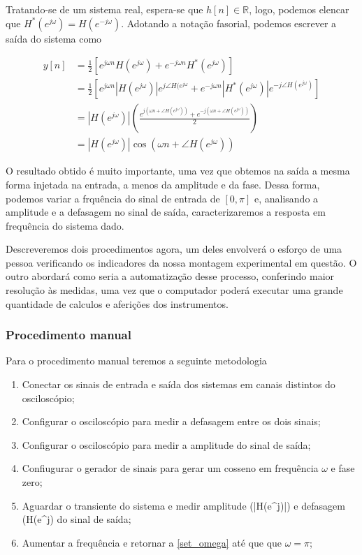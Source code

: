 \documentclass[x11names,a4paper,12pt]{article}
\begin{document}
Tratando-se de um sistema real, espera-se que $h[n] \in \mathbb{R}$, logo, podemos elencar que $H^{*}(e^{j\omega})=H(e^{-j\omega})$. Adotando a notação fasorial, podemos escrever a saída do sistema como

\begin{equation}
  \begin{aligned}
    y[n] & = \frac{1}{2} \left[ e^{j\omega n} H(e^{j\omega}) + e^{-j\omega n} H^*(e^{j\omega}) \right] \\
         & = \frac{1}{2} \left[ e^{j\omega n}|H(e^{j\omega})|e^{j\angle H(e^{j\omega}} + e^{-j\omega n} |H^*(e^{j\omega})|e^{-j\angle H(e^{j\omega})} \right] \\
         & = |H(e^{j\omega})| \left( \frac{e^{j(\omega n + \angle H(e^{j\omega}))} + e^{-j(\omega n + \angle H(e^{j\omega}))}}{2} \right) \\
         & = |H(e^{j\omega})| \cos{(\omega n + \angle H(e^{j\omega}))}
  \end{aligned}
\end{equation}

O resultado obtido é muito importante, uma vez que obtemos na saída a mesma forma injetada na entrada, a menos da amplitude e da fase. Dessa forma, podemos variar a frquência do sinal de entrada de $[0,\pi]$ e, analisando a amplitude e a defasagem no sinal de saída, caracterizaremos a resposta em frequência do sistema dado.

Descreveremos dois procedimentos agora, um deles envolverá o esforço de uma pessoa verificando os indicadores da nossa montagem experimental em questão. O outro abordará como seria a automatização desse processo, conferindo maior resolução às medidas, uma vez que o computador poderá executar uma grande quantidade de calculos e aferições dos instrumentos.

\subsubsection{Procedimento manual}

Para o procedimento manual teremos a seguinte metodologia

\begin{enumerate}
  \item Conectar os sinais de entrada e saída dos sistemas em canais distintos do osciloscópio;
  \item Configurar o osciloscópio para medir a defasagem entre os dois sinais;
  \item Configurar o osciloscópio para medir a amplitude do sinal de saída;
  \item Confiugurar o gerador de sinais para gerar um cosseno em frequência $\omega$ e fase zero; \label{set_omega}
  \item Aguardar o transiente do sistema e medir amplitude (|H(e^{j\omega})|) e defasagem (\angle H(e^{j\omega}) do sinal de saída;
  \item Aumentar a frequência e retornar a \ref{set_omega} até que que $\omega=\pi$;
\end{enumerate}
\end{document}
